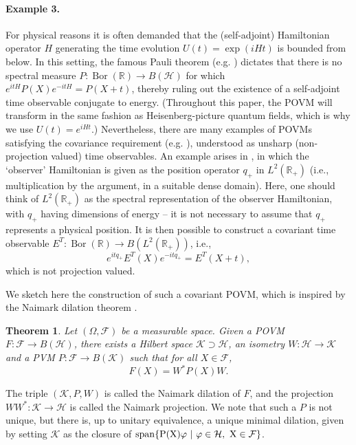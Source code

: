 \documentclass[sn-mathphys-num]{sn-jnl}%
\newcommand{\HH}{\mathcal{H}}
\DeclareMathOperator{\Bor}{Bor}
\numberwithin{equation}{section}
\theoremstyle{thmstyleone}%
\newtheorem{theorem}{Theorem}[section]%
\theoremstyle{thmstyletwo}%
\theoremstyle{thmstylethree}%
\begin{document}
\paragraph{Example 3.}
For physical reasons it is often demanded that the (self-adjoint) Hamiltonian operator $H$ generating the time evolution $U(t)=\exp(iHt)$ is bounded from below. In this setting, the famous Pauli theorem (e.g. \cite{pauli2012general}) dictates that there is no spectral measure $P:\Bor(\mathbb{R}) \to B(\mathcal{H})$ for which $e^{itH}P(X)e^{-itH}=P(X+t)$, thereby ruling out the existence of a self-adjoint time observable conjugate to energy.
(Throughout this paper, the POVM will transform in the same fashion as Heisenberg-picture quantum fields, which is why we use $U(t)=e^{iHt}$.)
Nevertheless, there are many examples of POVMs satisfying the covariance requirement (e.g. \cite{busch1994time,PhysRevA.66.044101,Busch2016a}), understood as unsharp (non-projection valued) time observables. An example arises in \cite{chandrasekaran2023algebra}, in which the `observer' Hamiltonian is given as the position operator $q_+$ in $L^2(\mathbb{R}_+)$ (i.e., multiplication by the argument, in a suitable dense domain). Here, one should think of  $L^2(\mathbb{R}_+)$ as the spectral representation of the observer Hamiltonian, with $q_+$ having dimensions of energy -- it is not necessary to assume that $q_+$ represents a physical position.
It is then possible to construct a covariant time observable $E^T: \Bor(\mathbb{R})\to B(L^2(\mathbb{R}_+))$, i.e., 
\begin{equation}\label{eq:unshrpp}
    e^{itq_+}E^T(X)e^{-itq_+}=E^T(X+t),
\end{equation}
which is not projection valued. 

We sketch here the construction of such a covariant POVM, which is inspired by the Naimark dilation theorem \cite{riesz2012functional,Busch2016a}. 
\begin{theorem}
\label{thm:naimark}
    Let $(\Omega,\mathcal{F})$ be a measurable space. Given a POVM $F:\mathcal{F} \to B(\HH)$, there exists a Hilbert space $\mathcal{K} \supset \HH$, an isometry $W:\HH\to \mathcal{K}$ and a PVM $P:\mathcal{F} \to B(\mathcal{K})$ such that for all $X \in \mathcal{F}$, 
    \begin{equation}
        F(X)=W^*P(X)W.
    \end{equation}
\end{theorem} 
The triple $(\mathcal{K},P,W)$ is called the Naimark dilation of $F$, and the projection $WW^*:\mathcal{K} \to \HH$ is called the Naimark projection.
We note that such a $P$ is not unique, but there is, up to unitary equivalence, a unique minimal dilation, given by setting $\mathcal{K}$ as the closure of $\rm{span}\{P(X)\varphi ~|~\varphi \in \HH,~X \in \mathcal{F}\}$.
\end{document}
